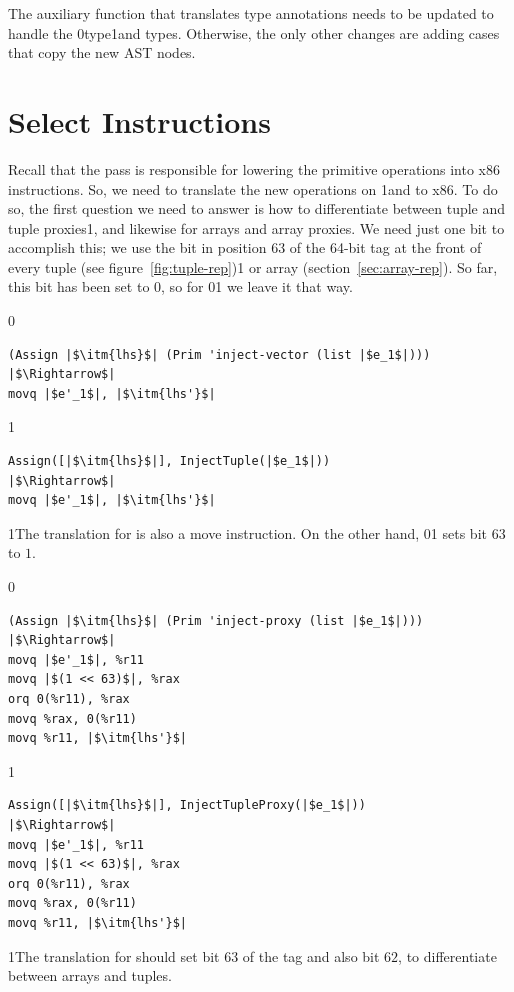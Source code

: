 \documentclass[7x10]{TimesAPriori_MIT}%
\def\racketEd{0}
\def\pythonEd{1}
\def\edition{1}
\newcommand{\racket}[1]{{\if\edition\racketEd{#1}\fi}}
\newcommand{\pythonColor}[0]{}
\newcommand{\python}[1]{{\if\edition\pythonEd\pythonColor #1\fi}}
\numberwithin{theorem}{chapter}
\numberwithin{definition}{chapter}
\numberwithin{equation}{chapter}
\begin{document}
The auxiliary function that translates type annotations needs to be
updated to handle the \PTUPLETYNAME{}
\racket{type}\python{and \PARRAYTYNAME{} types}.
%
Otherwise, the only other changes are adding cases that copy the new
AST nodes.

\section{Select Instructions }
\label{sec:select-instructions-gradual}

Recall that the  pass is responsible for
lowering the primitive operations into x86 instructions.  So, we need
to translate the new operations on \PTUPLETYNAME{} \python{and \PARRAYTYNAME{}}
to x86.  To do so, the first question we need to answer is how to
differentiate between tuple and tuple proxies\python{, and likewise for
arrays and array proxies}.  We need just one bit to accomplish this;
we use the bit in position $63$ of the 64-bit tag at the front of
every tuple (see figure~\ref{fig:tuple-rep})\python{ or array
(section~\ref{sec:array-rep})}. So far, this bit has been set to $0$,
so for \racket{}\python{} we leave
it that way.
{\if\edition\racketEd    
\begin{lstlisting}
(Assign |$\itm{lhs}$| (Prim 'inject-vector (list |$e_1$|)))
|$\Rightarrow$|  
movq |$e'_1$|, |$\itm{lhs'}$|
\end{lstlisting}
\fi}
{\if\edition\pythonEd\pythonColor    
\begin{lstlisting}
Assign([|$\itm{lhs}$|], InjectTuple(|$e_1$|))
|$\Rightarrow$|  
movq |$e'_1$|, |$\itm{lhs'}$|
\end{lstlisting}
\fi}
\python{The translation for  is also a move instruction.}
\noindent On the other hand,
\racket{}\python{} sets bit
$63$ to $1$.
%
{\if\edition\racketEd
\begin{lstlisting}  
(Assign |$\itm{lhs}$| (Prim 'inject-proxy (list |$e_1$|)))
|$\Rightarrow$|  
movq |$e'_1$|, %r11
movq |$(1 << 63)$|, %rax
orq 0(%r11), %rax
movq %rax, 0(%r11)
movq %r11, |$\itm{lhs'}$|
\end{lstlisting}
\fi}
{\if\edition\pythonEd\pythonColor
\begin{lstlisting}  
Assign([|$\itm{lhs}$|], InjectTupleProxy(|$e_1$|))
|$\Rightarrow$|  
movq |$e'_1$|, %r11
movq |$(1 << 63)$|, %rax
orq 0(%r11), %rax
movq %rax, 0(%r11)
movq %r11, |$\itm{lhs'}$|
\end{lstlisting}
\fi}
\python{\noindent The translation for  should set bit $63$
  of the tag and also bit $62$, to differentiate between arrays and tuples.}
\end{document}
